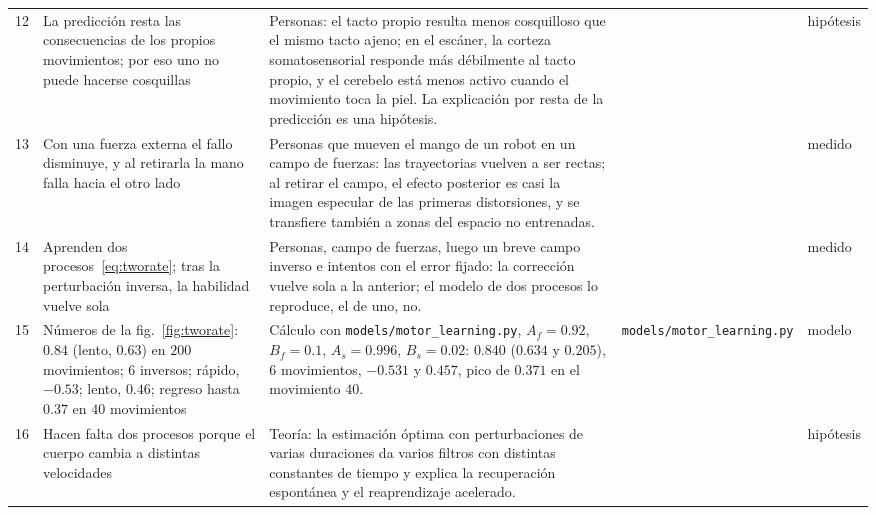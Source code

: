 {\begin{longtable}{>{\raggedright}p{0.5cm}>{\raggedright}p{4.0cm}>{\raggedright}p{5.6cm}>{\raggedright}p{2.3cm}>{\raggedright\arraybackslash}p{1.7cm}}
12 & La predicción resta las consecuencias de los propios movimientos; por eso uno no puede hacerse cosquillas & Personas: el tacto propio resulta menos cosquilloso que el mismo tacto ajeno; en el escáner, la corteza somatosensorial responde más débilmente al tacto propio, y el cerebelo está menos activo cuando el movimiento toca la piel. La explicación por resta de la predicción es una hipótesis. & \cite{Blakemore1998} & hipótesis \\
13 & Con una fuerza externa el fallo disminuye, y al retirarla la mano falla hacia el otro lado & Personas que mueven el mango de un robot en un campo de fuerzas: las trayectorias vuelven a ser rectas; al retirar el campo, el efecto posterior es casi la imagen especular de las primeras distorsiones, y se transfiere también a zonas del espacio no entrenadas. & \cite{ShadmehrMussaIvaldi1994} & medido \\
14 & Aprenden dos procesos~\eqref{eq:tworate}; tras la perturbación inversa, la habilidad vuelve sola & Personas, campo de fuerzas, luego un breve campo inverso e intentos con el error fijado: la corrección vuelve sola a la anterior; el modelo de dos procesos lo reproduce, el de uno, no. & \cite{Smith2006} & medido \\
15 & Números de la fig.~\ref{fig:tworate}: $0.84$ (lento, $0.63$) en $200$ movimientos; $6$ inversos; rápido, $-0.53$; lento, $0.46$; regreso hasta $0.37$ en $40$ movimientos & Cálculo con \texttt{models/\allowbreak motor\_\allowbreak learning.py}, $A_f=0.92$, $B_f=0.1$, $A_s=0.996$, $B_s=0.02$: $0.840$ ($0.634$ y $0.205$), $6$ movimientos, $-0.531$ y $0.457$, pico de $0.371$ en el movimiento $40$. & \texttt{models/\allowbreak motor\_\allowbreak learning.py} & modelo \\
16 & Hacen falta dos procesos porque el cuerpo cambia a distintas velocidades & Teoría: la estimación óptima con perturbaciones de varias duraciones da varios filtros con distintas constantes de tiempo y explica la recuperación espontánea y el reaprendizaje acelerado. & \cite{Kording2007} & hipótesis \\
\bottomrule
\end{longtable}}
